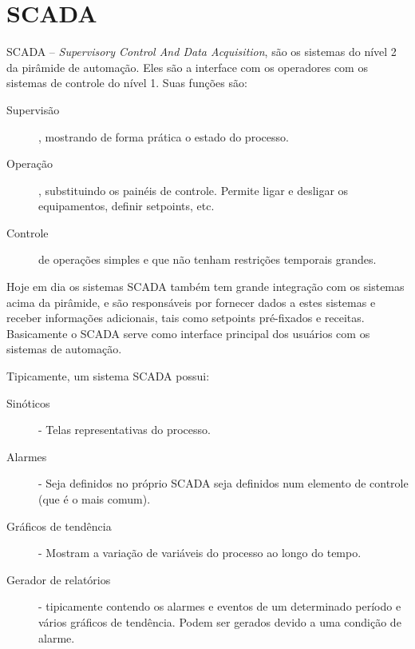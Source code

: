 \section{SCADA}

SCADA -- \emph{Supervisory Control And Data Acquisition}, são os sistemas do nível 2 da pirâmide de automação. Eles são a interface com os operadores com os sistemas de controle do nível 1. Suas funções são:

\begin{description}
\item[Supervisão], mostrando de forma prática o estado do processo.
\item[Operação], substituindo os painéis de controle. Permite ligar e desligar os equipamentos, definir setpoints, etc.
\item[Controle] de operações simples e que não tenham restrições temporais grandes.
\end{description}

Hoje em dia os sistemas SCADA também tem grande integração com os sistemas acima da pirâmide, e são responsáveis por fornecer dados a estes sistemas e receber informações adicionais, tais como setpoints pré-fixados e receitas. Basicamente o SCADA serve como interface principal dos usuários com os sistemas de automação.

Tipicamente, um sistema SCADA possui:
\begin{description}
	\item[Sinóticos] - Telas representativas do processo.
	\item[Alarmes] - Seja definidos no próprio SCADA seja definidos num elemento de controle (que é o mais comum).
	\item[Gráficos de tendência] - Mostram a variação de variáveis do processo ao longo do tempo.
	\item[Gerador de relatórios] - tipicamente contendo os alarmes e eventos de um determinado período e vários gráficos de tendência. Podem ser gerados devido a uma condição de alarme.
\end{description}

